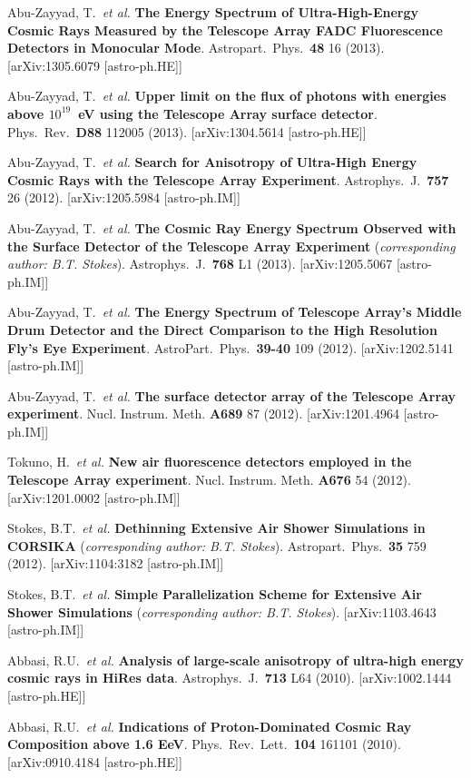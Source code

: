 \begin{resume}
Abu-Zayyad, T.\ {\it et al.} {\bf The Energy Spectrum of Ultra-High-Energy Cosmic Rays Measured by the Telescope Array FADC Fluorescence Detectors in Monocular Mode}. Astropart.\ Phys.\ {\bf 48} 16 (2013). [arXiv:1305.6079 [astro-ph.HE]]

\newpage

Abu-Zayyad, T.\ {\it et al.} {\bf Upper limit on the flux of photons with energies above \boldmath$10^{19}$~eV using the Telescope Array surface detector}. Phys.\ Rev.\ {\bf D88} 112005 (2013). [arXiv:1304.5614 [astro-ph.HE]]

Abu-Zayyad, T.\ {\it et al.} {\bf Search for Anisotropy of Ultra-High Energy Cosmic Rays with the Telescope Array Experiment}. Astrophys.\ J.\ {\bf 757} 26 (2012).  [arXiv:1205.5984 [astro-ph.IM]]

Abu-Zayyad, T.\ {\it et al.} {\bf The Cosmic Ray Energy Spectrum Observed with the Surface Detector of the Telescope Array Experiment} ({\it corresponding author: B.T. Stokes}). Astrophys.\ J.\ {\bf 768} L1 (2013). [arXiv:1205.5067 [astro-ph.IM]]

Abu-Zayyad, T.\ {\it et al.} {\bf The Energy Spectrum of Telescope Array's Middle Drum Detector and the Direct Comparison to the High Resolution Fly's Eye Experiment}. AstroPart.\ Phys.\ {\bf 39-40} 109 (2012). [arXiv:1202.5141 [astro-ph.IM]]

Abu-Zayyad, T.\ {\it et al.} {\bf The surface detector array of the Telescope Array experiment}. Nucl. Instrum. Meth. {\bf A689} 87 (2012). [arXiv:1201.4964 [astro-ph.IM]]

Tokuno, H.\ {\it et al.} {\bf New air fluorescence detectors employed in the Telescope Array experiment}. Nucl. Instrum. Meth. {\bf A676} 54 (2012). [arXiv:1201.0002 [astro-ph.IM]]

Stokes, B.T.\ {\it et al.} {\bf Dethinning Extensive Air Shower Simulations in CORSIKA} ({\it corresponding author: B.T. Stokes}). Astropart.\ Phys.\ {\bf 35} 759 (2012). [arXiv:1104:3182 [astro-ph.IM]]

Stokes, B.T.\ {\it et al.} {\bf Simple Parallelization Scheme for Extensive Air Shower Simulations} ({\it corresponding author: B.T. Stokes}). [arXiv:1103.4643 [astro-ph.IM]]

Abbasi, R.U.\ {\it et al.} {\bf Analysis of large-scale anisotropy of ultra-high energy cosmic rays in HiRes data}. Astrophys.\ J.\ {\bf 713} L64 (2010). [arXiv:1002.1444 [astro-ph.HE]]

Abbasi, R.U.\ {\it et al.} {\bf Indications of Proton-Dominated Cosmic Ray Composition above 1.6 EeV}. Phys.\ Rev.\ Lett.\ {\bf 104} 161101 (2010). [arXiv:0910.4184 [astro-ph.HE]]


\end{resume}
